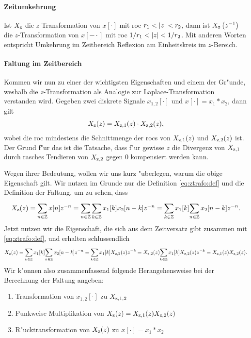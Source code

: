 \paragraph{Zeitumkehrung}
Ist $X_{\rm z}$ die $z$-Transformation von $x[\cdot]$ mit \gls{roc} $r_1 < {\left| z \right|} < r_2$, dann ist $X_{{\rm z}}\left(z^{-1}\right)$ die $z$-Transformation von $x[-\cdot]$ mit \gls{roc} $1/r_1 < {\left| z \right|} < 1/r_2$.
Mit anderen Worten entspricht Umkehrung im Zeitbereich Reflexion am Einheitskreis im $z$-Bereich.
%
\paragraph{Faltung im Zeitbereich}
%
Kommen wir nun zu einer der wichtigsten Eigenschaften und einem der Gr"unde, weshalb die $z$-Transformation als Analogie zur Laplace-Transformation verstanden wird.
Gegeben zwei diskrete Signale $x_{1,2}[\cdot]$ und $x[\cdot] = x_1 \ast x_2$, dann gilt 
\begin{equation}\label{eq:ztrafo:conv}
    X_{{\rm z}}(z) = X_{{\rm z},1}(z) \cdot X_{{\rm z},2}(z),
\end{equation}
wobei die \gls{roc} mindestens die Schnittmenge der \glspl{roc} von $X_{{\rm z},1}(z)$ und $X_{{\rm z},2}(z)$ ist.
Der Grund f"ur das  ist die Tatsache, dass f"ur gewisse $z$ die Divergenz von $X_{{\rm z},1}$ durch rasches Tendieren von $X_{{\rm z},2}$ gegen $0$ kompensiert werden kann.

Wegen ihrer Bedeutung, wollen wir uns kurz "uberlegen, warum die obige Eigenschaft gilt.
Wir nutzen im Grunde nur die Definition \eqref{eq:ztrafo:def} und die Definition der Faltung, um zu sehen, dass
\[
X_{\rm z}(z) 
    = {\sum\limits_{n \in \mathbb{Z}}^{}{x[n] z^{-n}}} 
    = {\sum\limits_{n \in \mathbb{Z}}^{}{
        {\sum\limits_{k \in \mathbb{Z}}^{}{x_1[k] x_2[n - k]}} z^{-n}
      }} 
    = {\sum\limits_{k \in \mathbb{Z}}^{}{
        x_1[k] {\sum\limits_{n \in \mathbb{Z}}^{}{x_2[n - k]}} z^{-n}
    }}.
\]
Jetzt nutzen wir die Eigenschaft, die sich aus dem Zeitversatz gibt zusammen mit \eqref{eq:ztrafo:def}, und erhalten schlussendlich
\[
    X_{\rm z}(z) 
    = {\sum\limits_{k \in \mathbb{Z}}^{}{
        x_1[k] {\sum\limits_{n \in \mathbb{Z}}^{}{x_2[n - k]}} z^{-n}
    }} 
    = {\sum\limits_{k \in \mathbb{Z}}^{}{
        x_1[k] X_{{\rm z}, 2}(z) z^{-k}
    }}
    = X_{{\rm z}, 2}(z) {\sum\limits_{k \in \mathbb{Z}}^{}{
        x_1[k] X_{{\rm z}, 2}(z) z^{-k}
    }}
    = X_{{\rm z},1}(z) X_{{\rm z}, 2}(z).
\]
Wir k"onnen also zusammenfassend folgende Herangehensweise bei der Berechnung der Faltung angeben:
\begin{enumerate}
    \item Transformation von $x_{1,2}[\cdot]$ zu $X_{{\rm z},1,2}$
    \item Punkweise Multiplikation von $X_{{\rm z}}(z) = X_{{\rm z},1}(z) X_{{\rm z},2}(z)$
    \item R"ucktransformation von $X_{{\rm z}}(z)$ zu $x[\cdot] = x_1 \ast x_2$
\end{enumerate}
%
